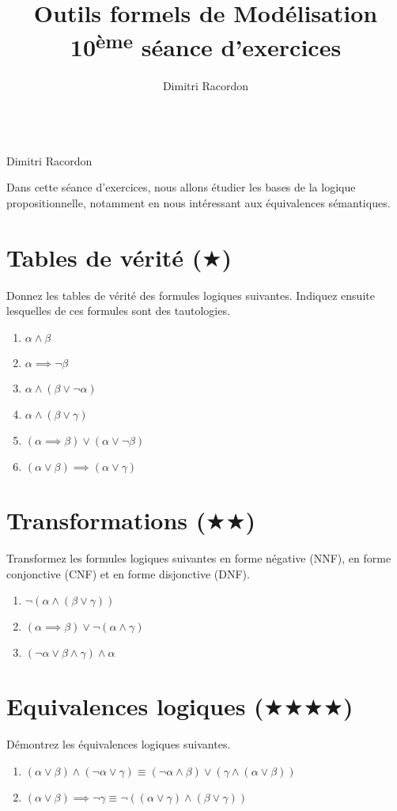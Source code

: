 \documentclass[a4paper, titlepage]{article}
\makeatletter
\numberwithin{figure}{section}
\numberwithin{table}{section}
\newcommand\objective[1]{\def\@objective{#1}}
\newcommand{\makecustomtitle}{%
	\begin{center}
		\huge\@title \\
		[1ex]\small Dimitri Racordon \\
	\end{center}
	\@objective
}
\makeatother
\begin{document}
  \title{Outils formels de Modélisation \\ 10\textsuperscript{ème} séance d'exercices}
  \author{Dimitri Racordon}
	\objective{Dans cette séance d'exercices, nous allons étudier les bases de la logique propositionnelle, notamment en nous intéressant aux équivalences sémantiques.}

	\makecustomtitle

  \section{Tables de vérité ($\bigstar$)}
    Donnez les tables de vérité des formules logiques suivantes. Indiquez ensuite lesquelles de ces formules sont des tautologies.
    \begin{multicols}{2}
      \begin{enumerate}
        \item $\alpha \land \beta$
        \item $\alpha \implies \lnot\beta$
        \item $\alpha \land (\beta \lor \lnot\alpha)$
        \item $\alpha \land (\beta \lor \gamma)$
        \item $(\alpha \implies \beta) \lor (\alpha \lor \lnot\beta)$
        \item $(\alpha \lor \beta) \implies (\alpha \lor \gamma)$
      \end{enumerate}
    \end{multicols}

  \section{Transformations ($\bigstar\bigstar$)}
    Transformez les formules logiques suivantes en forme négative (NNF), en forme conjonctive (CNF) et en forme disjonctive (DNF).
    \begin{multicols}{2}
      \begin{enumerate}
        \item $\lnot(\alpha \land (\beta \lor \gamma))$
        \item $(\alpha \implies \beta) \lor \lnot(\alpha \land \gamma)$
        \item $(\lnot\alpha \lor \beta \land \gamma) \land \alpha$
      \end{enumerate}
    \end{multicols}

  \section{Equivalences logiques ($\bigstar\bigstar\bigstar\bigstar$)}
    Démontrez les équivalences logiques suivantes.
    \begin{enumerate}
      \item $(\alpha \lor \beta) \land (\lnot\alpha \lor \gamma)
              \equiv (\lnot\alpha \land \beta) \lor (\gamma \land (\alpha \lor \beta))$
      \item $(\alpha \lor \beta) \implies \lnot\gamma
              \equiv \lnot((\alpha \lor \gamma) \land (\beta \lor \gamma))$
    \end{enumerate}
\end{document}
